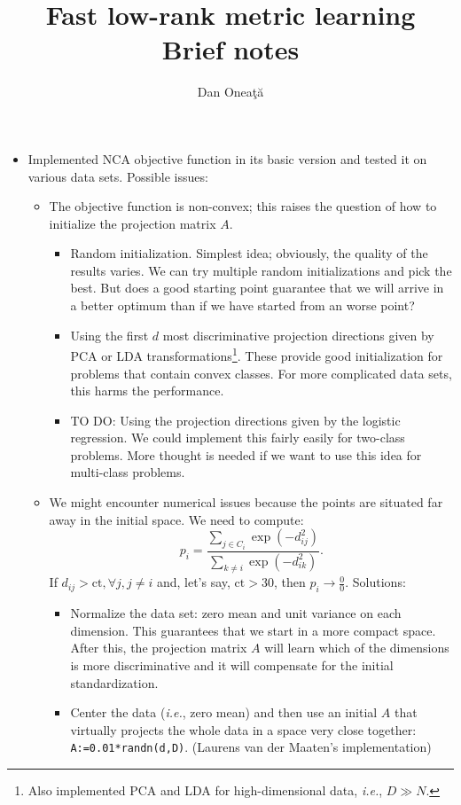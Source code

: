 \documentclass[]{article}
\title{Fast low-rank metric learning\\Brief notes}
\author{Dan Onea\c{t}\u{a}}
\date{}
\begin{document}
  \maketitle
  
  \begin{itemize}
    \item Implemented NCA objective function in its basic version and tested it on various data sets. Possible issues:
    \begin{itemize}
      \item The objective function is non-convex; this raises the question of how to initialize the projection matrix $A$. 
      \begin{itemize}
         \item Random initialization. Simplest idea; obviously, the quality of the results varies. We can try multiple random initializations and pick the best. But does a good starting point guarantee that we will arrive in a better optimum than if we have started from an worse point? 
         \item Using the first $d$ most discriminative projection directions given by PCA or LDA transformations\footnote{Also implemented PCA and LDA for high-dimensional data, \textit{i.e.}, $D\gg N$.}. These provide good initialization for problems that contain convex classes. For more complicated data sets, this harms the performance. 
         \item TO DO: Using the projection directions given by the logistic regression. We could implement this fairly easily for two-class problems. More thought is needed if we want to use this idea for multi-class problems.
      \end{itemize}
      \item We might encounter numerical issues because the points are situated far away in the initial space. We need to compute:
         \[p_i = \frac{\sum_{j\in C_i} \exp(-d_{ij}^2)}{\sum_{k\neq i} \exp(-d_{ik}^2)}.\]
       If $d_{ij} > \mbox{ct}, \forall j, j\neq i$ and, let's say, $\mbox{ct} > 30$, then $p_i \rightarrow \frac{0}{0}$. 
       Solutions:
        \begin{itemize}
          \item Normalize the data set: zero mean and unit variance on each dimension. This guarantees that we start in a more compact space. After this, the projection matrix $A$ will learn which of the dimensions is more discriminative and it will compensate for the initial standardization.
          \item Center the data (\textit{i.e.}, zero mean) and then use an initial $A$ that virtually projects the whole data in a space very close together: \texttt{A:=0.01*randn(d,D)}. (Laurens van der Maaten's implementation)

\end{itemize}
\end{itemize}
\end{itemize}
\end{document}
